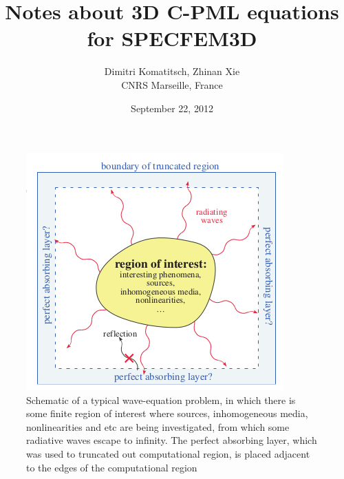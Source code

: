 \documentclass[onecolumn,extra]{gji_modified_cours_UPPA}
\begin{document}
\title{Notes about 3D C-PML equations for SPECFEM3D}
%
\author[Dimitri Komatitsch, Zhinan Xie]{Dimitri Komatitsch, Zhinan Xie\\
CNRS Marseille, France}
%
\date{September 22, 2012}

\maketitle

\begin{figure}
\includegraphics[scale=0.5]{pml_schematic.png}
\caption{Schematic of a typical wave-equation problem, in which there is some finite region of interest where sources,
inhomogeneous media, nonlinearities and etc are being investigated, from which some radiative waves escape to infinity.
The perfect absorbing layer, which was used to truncated out computational region, is placed adjacent to the edges of the
computational region}
\end{figure}
\end{document}
